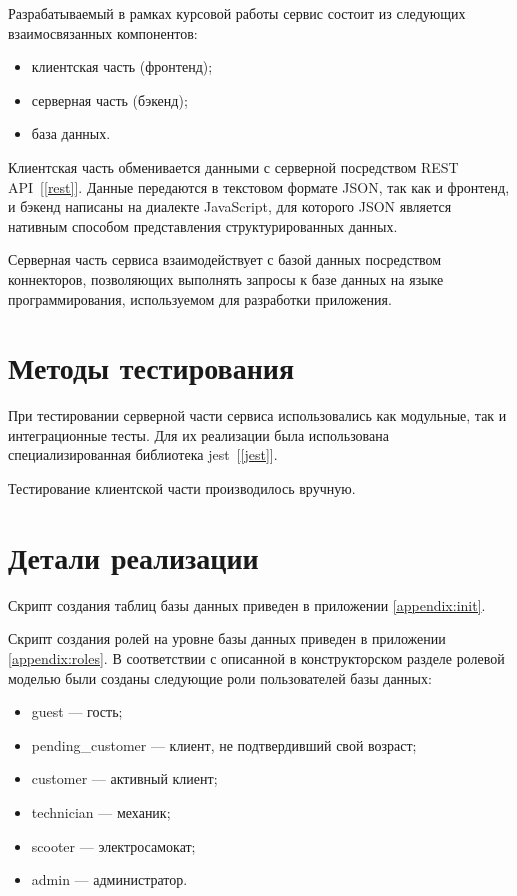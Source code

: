 Разрабатываемый в рамках курсовой работы сервис состоит из следующих взаимосвязанных компонентов:

\begin{itemize}
    \item клиентская часть (фронтенд);
    \item серверная часть (бэкенд);
    \item база данных.
\end{itemize}

Клиентская часть обменивается данными с серверной посредством REST API~[\ref{rest}]. Данные передаются в текстовом формате JSON, так как и фронтенд, и бэкенд написаны на диалекте JavaScript, для которого JSON является нативным способом представления структурированных данных.

Серверная часть сервиса взаимодействует с базой данных посредством коннекторов, позволяющих выполнять запросы к базе данных на языке программирования, используемом для разработки приложения.

\section{Методы тестирования}

При тестировании серверной части сервиса использовались как модульные, так и интеграционные тесты. Для их реализации была использована специализированная библиотека jest~[\ref{jest}].

Тестирование клиентской части производилось вручную.

\section{Детали реализации}

Скрипт создания таблиц базы данных приведен в приложении \ref{appendix:init}.

Скрипт создания ролей на уровне базы данных приведен в приложении \ref{appendix:roles}. В соответствии с описанной в конструкторском разделе ролевой моделью были созданы следующие роли пользователей базы данных:

\begin{itemize}
    \item guest --- гость;
    \item pending\_customer --- клиент, не подтвердивший свой возраст;
    \item customer --- активный клиент;
    \item technician --- механик;
    \item scooter --- электросамокат;
    \item admin --- администратор.
\end{itemize}

